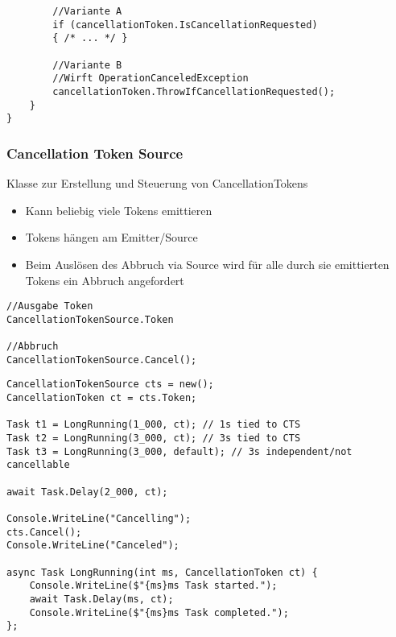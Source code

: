 \begin{multicols*}{2}
\begin{lstlisting}
        //Variante A
        if (cancellationToken.IsCancellationRequested) 
        { /* ... */ }
        
        //Variante B
        //Wirft OperationCanceledException
        cancellationToken.ThrowIfCancellationRequested();
    }
}
\end{lstlisting}
\subsubsection{Cancellation Token Source}
Klasse zur Erstellung und Steuerung von CancellationTokens
\begin{itemize}
    \item Kann beliebig viele Tokens emittieren
    \item Tokens hängen am Emitter/Source
    \item Beim Auslösen des Abbruch via Source wird für alle durch sie emittierten Tokens ein Abbruch angefordert
\end{itemize}
\begin{lstlisting}
//Ausgabe Token
CancellationTokenSource.Token

//Abbruch
CancellationTokenSource.Cancel();
\end{lstlisting}
\begin{lstlisting}
CancellationTokenSource cts = new(); 
CancellationToken ct = cts.Token;

Task t1 = LongRunning(1_000, ct); // 1s tied to CTS
Task t2 = LongRunning(3_000, ct); // 3s tied to CTS
Task t3 = LongRunning(3_000, default); // 3s independent/not cancellable

await Task.Delay(2_000, ct);

Console.WriteLine("Cancelling"); 
cts.Cancel(); 
Console.WriteLine("Canceled");

async Task LongRunning(int ms, CancellationToken ct) {
    Console.WriteLine($"{ms}ms Task started."); 
    await Task.Delay(ms, ct); 
    Console.WriteLine($"{ms}ms Task completed.");
};
\end{lstlisting}
\end{multicols*}